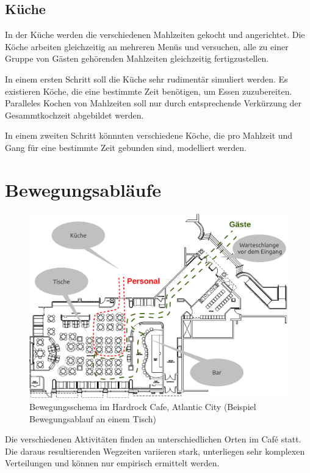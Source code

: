 \documentclass[ngerman,a4paper,12pt]{scrreprt}
\begin{document}
\subsection{Küche}
	In der Küche werden die verschiedenen Mahlzeiten gekocht und angerichtet. Die Köche arbeiten gleichzeitig an mehreren Menüs und versuchen, alle zu einer Gruppe von Gästen gehörenden Mahlzeiten  gleichzeitig fertigzustellen.

	In einem ersten Schritt soll die Küche sehr rudimentär simuliert werden. Es existieren Köche, die eine bestimmte Zeit benötigen, um Essen zuzubereiten. Paralleles Kochen von Mahlzeiten soll nur durch entsprechende Verkürzung der Gesammtkochzeit abgebildet werden.

	In einem zweiten Schritt könnnten verschiedene Köche, die pro Mahlzeit und Gang für eine bestimmte Zeit gebunden sind, modelliert werden.


\section{Bewegungsabläufe}
	\begin{figure}[H]
		\centering
			\includegraphics[width=1\textwidth]{img/hardrockSchema.pdf}
			\caption[Bewegungsschema Hardrock]{Bewegungsschema im Hardrock Cafe, Atlantic City (Beispiel Bewegungsablauf an einem Tisch)}
			\label{schemaHardrock}
	\end{figure}

	Die verschiedenen Aktivitäten finden an unterschiedlichen Orten im Café statt. Die daraus resultierenden Wegzeiten variieren stark, unterliegen sehr komplexen Verteilungen und können nur empirisch ermittelt werden.
\end{document}
